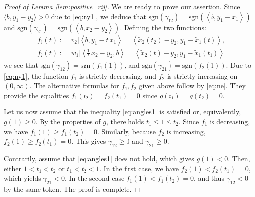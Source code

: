 \documentclass[11pt,letterpaper,reqno]{amsart}
\theoremstyle{definition}
\numberwithin{equation}{section}
\newcommand{\pairing}[1]{{\left \langle #1 \right \rangle}}
\newcommand{\abs}[1]{{\left \lvert #1 \right \rvert}}
\begin{document}
{\begin{proof}[Proof of Lemma \ref{lem:positive_rij}]
	We are ready to prove our assertion. Since $\langle b, y_{1}-y_2 \rangle >0$ due to \eqref{eq:ny1}, we deduce that
	  $\mathrm{sgn} (\gamma_{12}) = \mathrm{sgn}  (\pairing{b,y_1-x_1})$ and $\mathrm{sgn}  (\gamma_{21}) = \mathrm{sgn}  (\pairing{b,x_2-y_2})$. Defining the two functions:
	\begin{align}
		\label{eq:f1f2}
		&f_1(t):=\abs{v_2} \pairing{b,y_1 - t \,x_1} =  \pairing{\tilde{x}_2(t_2)- y_2,y_1 - \tilde{x}_1(t)},\\
		&f_2(t):=\abs{w_1} \pairing{\tfrac{1}{t}\,x_2 - y_2,b} = \pairing{\tilde{x}_2(t) - y_2,y_1 - \tilde{x}_1(t_1)}
	\end{align}
	we see that $\mathrm{sgn}  (\gamma_{12}) = \mathrm{sgn} (f_1(1))$, and $\mathrm{sgn}  (\gamma_{21}) = \mathrm{sgn} (f_2(1))$.
	Due to \eqref{eq:ny1}, the function $f_1$  is strictly decreasing, and $f_2$ is strictly increasing on $(0,\infty)$. The alternative formulas for $f_1,f_2$ given above follow by \eqref{eq:ne}. They provide the equalities $f_1(t_2) = f_2(t_1) = 0$ since $g(t_1) = g(t_2) =0$.
	
	Let us now assume that the inequality \eqref{eq:angles1} is satisfied or, equivalently,  $g(1) \geq 0$. By the properties of $g$, there holds $t_1 \leq 1 \leq t_2$. Since $f_1$ is decreasing, we have $f_1(1) \geq f_1(t_2) =  0$. Similarly, because $f_2$ is increasing, $f_2(1) \geq f_2(t_1)  =0$. This gives $\gamma_{12} \geq 0$ and $\gamma_{21} \geq 0$.
	
	Contrarily, assume that  \eqref{eq:angles1} does not hold, which gives $g(1) <0$. Then, either $1 <t_1 <t_2$ or $t_1<t_2 < 1$. In the first case, we have $f_2(1)< f_2(t_1)  = 0$, which  yields $\gamma_{21}<0$. In the second case $f_1(1)<f_1(t_2)  = 0$,  and thus $\gamma_{12}<0$ by the same token. The proof is complete.
\end{proof}

\smallskip

}
\end{document}
